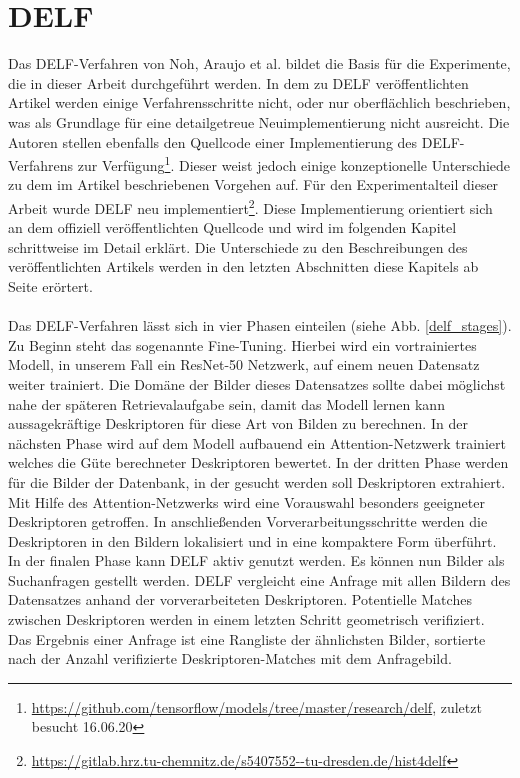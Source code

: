 \chapter{DELF}\label{delf_chapter}
Das DELF-Verfahren \cite{delf} von Noh, \mbox{Araujo} et al. bildet die Basis für die Experimente, die in dieser Arbeit durchgeführt werden.
In dem zu DELF veröffentlichten Artikel werden einige Verfahrensschritte nicht, oder nur oberflächlich beschrieben, was als Grundlage für eine detailgetreue Neuimplementierung nicht ausreicht. Die Autoren stellen ebenfalls den Quellcode einer Implementierung des DELF-Verfahrens zur Verfügung\footnote{\url{https://github.com/tensorflow/models/tree/master/research/delf}, zuletzt besucht 16.06.20}. Dieser weist jedoch einige konzeptionelle Unterschiede zu dem im Artikel beschriebenen Vorgehen auf. Für den Experimentalteil dieser Arbeit wurde DELF neu implementiert\footnote{\url{https://gitlab.hrz.tu-chemnitz.de/s5407552--tu-dresden.de/hist4delf}}. Diese Implementierung orientiert sich an dem offiziell veröffentlichten Quellcode und wird im folgenden Kapitel schrittweise im Detail erklärt. Die Unterschiede zu den Beschreibungen des veröffentlichten Artikels werden in den letzten Abschnitten diese Kapitels ab Seite \pageref{pipeline_changes}  erörtert.  
\\\\
Das DELF-Verfahren lässt sich in vier Phasen einteilen (siehe Abb. \ref{delf_stages}). Zu Beginn steht das sogenannte Fine-Tuning. Hierbei wird ein vortrainiertes Modell, in unserem Fall ein ResNet-50 Netzwerk, auf einem neuen Datensatz weiter trainiert. Die Domäne der Bilder dieses Datensatzes sollte dabei möglichst nahe der späteren Retrievalaufgabe sein, damit das Modell lernen kann aussagekräftige Deskriptoren für diese Art von Bilden zu berechnen. In der nächsten Phase wird auf dem Modell aufbauend ein Attention-Netzwerk trainiert welches die Güte berechneter Deskriptoren bewertet. In der dritten Phase werden für die Bilder der Datenbank, in der gesucht werden soll Deskriptoren extrahiert. Mit Hilfe des Attention-Netzwerks wird eine Vorauswahl besonders geeigneter Deskriptoren getroffen. In anschließenden Vorverarbeitungsschritte werden die Deskriptoren in den Bildern lokalisiert und in eine kompaktere Form überführt. In der finalen Phase kann DELF aktiv genutzt werden. Es können nun Bilder als Suchanfragen gestellt werden. DELF vergleicht eine Anfrage mit allen Bildern des Datensatzes anhand der vorverarbeiteten Deskriptoren. Potentielle Matches zwischen Deskriptoren werden in einem letzten Schritt geometrisch verifiziert. Das Ergebnis einer Anfrage ist eine Rangliste der ähnlichsten Bilder, sortierte nach der Anzahl verifizierte Deskriptoren-Matches mit dem Anfragebild.
